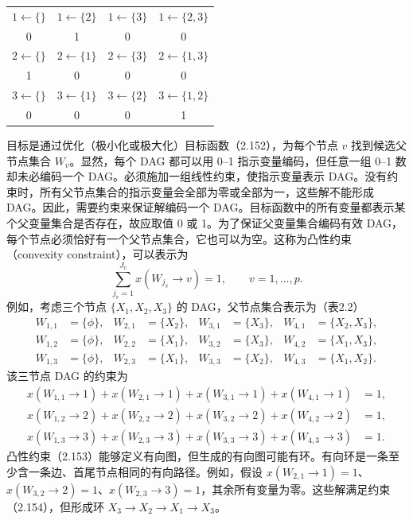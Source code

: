 \begin{figure}[htbp]
\centering
{}
\end{figure}
\begin{table}[htbp]
\centering
{}
\begin{tabular}{cccc}
\toprule
$1\leftarrow\{\}$&$1\leftarrow\{2\}$&$1\leftarrow\{3\}$&$1\leftarrow\{2,3\}$\\
0&1&0&0\\
$2\leftarrow\{\}$&$2\leftarrow\{1\}$&$2\leftarrow\{3\}$&$2\leftarrow\{1,3\}$\\
1&0&0&0\\
$3\leftarrow\{\}$&$3\leftarrow\{1\}$&$3\leftarrow\{2\}$&$3\leftarrow\{1,2\}$\\
0&0&0&1\\
\bottomrule
\end{tabular}
\end{table}
目标是通过优化（极小化或极大化）目标函数（2.152），为每个节点 $v$ 找到候选父节点集合 $W_v$。显然，每个 DAG 都可以用 0--1 指示变量编码，但任意一组 0--1 数却未必编码一个 DAG。必须施加一组线性约束，使指示变量表示 DAG。没有约束时，所有父节点集合的指示变量会全部为零或全部为一，这些解不能形成 DAG。因此，需要约束来保证解编码一个 DAG。目标函数中的所有变量都表示某个父变量集合是否存在，故应取值 0 或 1。为了保证父变量集合编码有效 DAG，每个节点必须恰好有一个父节点集合，它也可以为空。这称为凸性约束（convexity constraint），可以表示为
\begin{equation}
\sum_{j_v=1}^{J_v}x(W_{j_v}\to v)=1,\qquad v=1,\ldots,p.
\tag{2.153}
\end{equation}
例如，考虑三个节点 $\{X_1,X_2,X_3\}$ 的 DAG，父节点集合表示为（表2.2）
\[
\begin{aligned}
W_{1,1}&=\{\phi\},&W_{2,1}&=\{X_2\},&W_{3,1}&=\{X_3\},&W_{4,1}&=\{X_2,X_3\},\\
W_{1,2}&=\{\phi\},&W_{2,2}&=\{X_1\},&W_{3,2}&=\{X_3\},&W_{4,2}&=\{X_1,X_3\},\\
W_{1,3}&=\{\phi\},&W_{2,3}&=\{X_1\},&W_{3,3}&=\{X_2\},&W_{4,3}&=\{X_1,X_2\}.
\end{aligned}
\]
该三节点 DAG 的约束为
\begin{equation}
\begin{aligned}
x(W_{1,1}\to1)+x(W_{2,1}\to1)+x(W_{3,1}\to1)+x(W_{4,1}\to1)&=1,\\
x(W_{1,2}\to2)+x(W_{2,2}\to2)+x(W_{3,2}\to2)+x(W_{4,2}\to2)&=1,\\
x(W_{1,3}\to3)+x(W_{2,3}\to3)+x(W_{3,3}\to3)+x(W_{4,3}\to3)&=1.
\end{aligned}\tag{2.154}
\end{equation}
凸性约束（2.153）能够定义有向图，但生成的有向图可能有环。有向环是一条至少含一条边、首尾节点相同的有向路径。例如，假设 $x(W_{2,1}\to1)=1$、$x(W_{3,2}\to2)=1$、$x(W_{2,3}\to3)=1$，其余所有变量为零。这些解满足约束（2.154），但形成环 $X_3\to X_2\to X_1\to X_3$。

